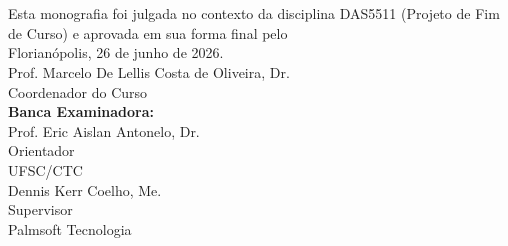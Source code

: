\imprimircapa

\imprimirfolhaderosto*

\begin{fichacatalografica}
	
\end{fichacatalografica}

\begin{folhadeaprovacao}
	\OnehalfSpacing
	\centering
	\imprimirautor\\%
	\vspace*{10pt}		
	\textbf{\imprimirtitulo}%
	\ifnotempty{\imprimirsubtitulo}{:~\imprimirsubtitulo}\\%
	\vspace*{\baselineskip}
	
	Esta monografia foi julgada no contexto da disciplina DAS5511 (Projeto de Fim de Curso) e aprovada em sua forma final pelo \imprimircurso\\
	\vspace*{\baselineskip}
	Florianópolis, 26 de junho de 2026.\\
	
	
	\vspace*{2\baselineskip}
	Prof. Marcelo De Lellis Costa de Oliveira, Dr.\\
	Coordenador do Curso\\
	
	\vspace*{\baselineskip}
	\textbf{Banca Examinadora:} \\
	
	
	\vspace*{2\baselineskip}
	Prof. Eric Aislan Antonelo, Dr.\\
	Orientador \\
	UFSC/CTC\\
	
	\vspace*{2\baselineskip}
	Dennis Kerr Coelho, Me.\\
	Supervisor \\
	Palmsoft Tecnologia\\
	

\end{folhadeaprovacao}

